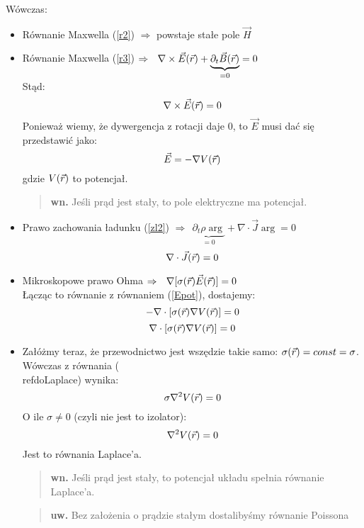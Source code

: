 Wówczas:\begin{itemize}
\item Równanie Maxwella (\ref{r2}) $\Rightarrow$ powstaje stałe pole $\vec{H}$
\item Równanie Maxwella (\ref{r3}) $\Rightarrow ~~ \nabla\times\vec{E}(\vec{r})+\underbrace{\partial_t\vec{B}(\vec{r})}_{=0}=0$ \\
Stąd:
\begin{equation} \nabla\times\vec{E}(\vec{r})=0 \end{equation}
Ponieważ wiemy, że dywergencja z rotacji daje 0, to $\vec{E}$ musi dać się przedstawić jako:
\begin{equation} \vec{E}=-\nabla V(\vec{r}) \label{Epot}\end{equation}
gdzie $V(\vec{r})$ to potencjał.
\begin{verse} \textbf{wn.} Jeśli prąd jest stały, to pole elektryczne ma potencjał. \end{verse} 
\item Prawo zachowania ładunku (\ref{zl2}) $\Rightarrow ~~ \underbrace{\partial_t\rho\arg}_{=0}+\nabla\cdot\vec{J}\arg=0 $
\begin{equation} \nabla\cdot\vec{J}({\vec{r}})=0 \end{equation}
\item Mikroskopowe prawo Ohma $\Rightarrow ~~ \nabla[\sigma(\vec{r})\vec{E}(\vec{r})]=0$ \\
Łącząc to równanie z równaniem (\ref{Epot}), dostajemy: \\ 
\begin{equation} -\nabla \cdot[\sigma(\vec{r}) \nabla V(\vec{r})] =0  \nonumber \end{equation}
\begin{equation} \nabla \cdot[\sigma(\vec{r}) \nabla V(\vec{r})] =0 \label{doLaplace} \end{equation}
\item Załóżmy teraz, że przewodnictwo jest wszędzie takie samo: $\sigma(\vec{r})=const=\sigma $.\\
Wówczas z równania (\\ref{doLaplace}) wynika:
\begin{equation} \sigma \nabla ^2 V(\vec{r}) =0 \end{equation}
O ile $\sigma \neq 0 $ (czyli nie jest to izolator):
\begin{equation} \nabla^2 V(\vec{r})=0\end{equation}
Jest to równania Laplace'a.
\begin{verse} \textbf{wn.} Jeśli prąd jest stały, to potencjał układu spełnia równanie Laplace'a. \end{verse}
\begin{verse} \textbf{uw.} Bez założenia o prądzie stałym dostalibyśmy równanie Poissona \end{verse}
\end{itemize}

